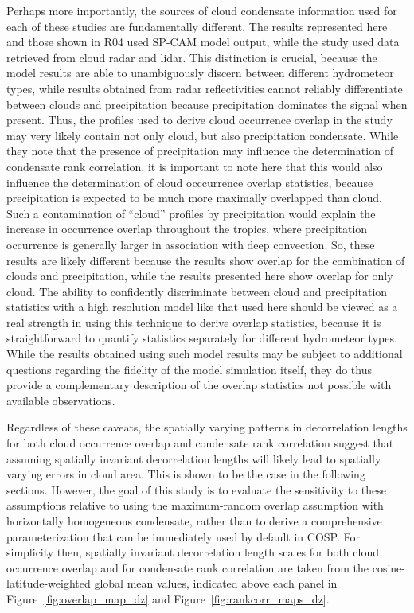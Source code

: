 Perhaps more importantly, the sources of cloud condensate information
used for each of these studies are fundamentally different. The results
represented here and those shown in R04 used SP-CAM model output, while
the \citet{oreopoulos_et_al_2012} study used data retrieved from cloud
radar and lidar. This distinction is crucial, because the model results
are able to unambiguously discern between different hydrometeor types,
while results obtained from radar reflectivities cannot reliably
differentiate between clouds and precipitation because precipitation
dominates the signal when present. Thus, the profiles used to derive
cloud occurrence overlap in the \citet{oreopoulos_et_al_2012} study may
very likely contain not only cloud, but also precipitation condensate.
While they note that the presence of precipitation may influence the
determination of condensate rank correlation, it is important to note
here that this would also influence the determination of cloud
occcurrence overlap statistics, because precipitation is expected to be
much more maximally overlapped than cloud. Such a contamination of
``cloud'' profiles by precipitation would explain the increase in
occurrence overlap throughout the tropics, where precipitation
occurrence is generally larger in association with deep convection. So,
these results are likely different because the
\citet{oreopoulos_et_al_2012} results show overlap for the combination
of clouds and precipitation, while the results presented here show
overlap for only cloud. The ability to confidently discriminate between
cloud and precipitation statistics with a high resolution model like
that used here should be viewed as a real strength in using this
technique to derive overlap statistics, because it is straightforward to
quantify statistics separately for different hydrometeor types. While
the results obtained using such model results may be subject to
additional questions regarding the fidelity of the model simulation
itself, they do thus provide a complementary description of the overlap
statistics not possible with available observations.

Regardless of these caveats, the spatially varying patterns in
decorrelation lengths for both cloud occurrence overlap and condensate
rank correlation suggest that assuming spatially invariant decorrelation
lengths will likely lead to spatially varying errors in cloud area. This
is shown to be the case in the following sections. However, the goal of
this study is to evaluate the sensitivity to these assumptions relative
to using the maximum-random overlap assumption with horizontally
homogeneous condensate, rather than to derive a comprehensive
parameterization that can be immediately used by default in COSP. For
simplicity then, spatially invariant decorrelation length scales for
both cloud occurrence overlap and for condensate rank correlation are
taken from the cosine-latitude-weighted global mean values, indicated
above each panel in Figure~\ref{fig:overlap_map_dz} and
Figure~\ref{fig:rankcorr_maps_dz}.

